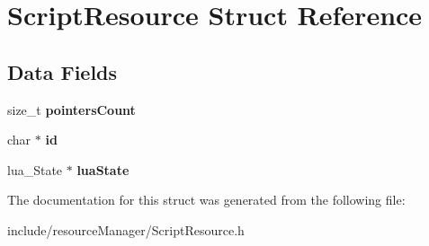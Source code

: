 \hypertarget{struct_script_resource}{}\section{Script\+Resource Struct Reference}
\label{struct_script_resource}
\subsection*{Data Fields}
\begin{DoxyCompactItemize}
\item 
\hypertarget{struct_script_resource_aa058e87a17f5f5079be31c1631ed5f50}{}\label{struct_script_resource_aa058e87a17f5f5079be31c1631ed5f50} 
size\+\_\+t {\bfseries pointers\+Count}
\item 
\hypertarget{struct_script_resource_aecb3b0d045ada529257a2fbf8f829599}{}\label{struct_script_resource_aecb3b0d045ada529257a2fbf8f829599} 
char $\ast$ {\bfseries id}
\item 
\hypertarget{struct_script_resource_a977f3d6715c13c5f13e6134222ffd6f8}{}\label{struct_script_resource_a977f3d6715c13c5f13e6134222ffd6f8} 
lua\+\_\+\+State $\ast$ {\bfseries lua\+State}
\end{DoxyCompactItemize}


The documentation for this struct was generated from the following file\+:\begin{DoxyCompactItemize}
\item 
include/resource\+Manager/Script\+Resource.\+h\end{DoxyCompactItemize}
